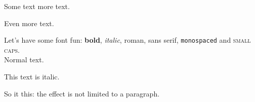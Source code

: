 \documentclass{article}
\begin{document}
\lipsum

\newpage

Some text \hspace{1cm} more text.

\vspace{10cm}

Even more text.

\newpage

Let's have some font fun: \textbf{bold}, \textit{italic}, \textrm{roman},
\textsf{sans serif}, \texttt{monospaced} and \textsc{small caps}.		\\

Normal text.

{\itshape

This text is italic.

So it this: the effect is not limited to a paragraph.

}
\end{document}
